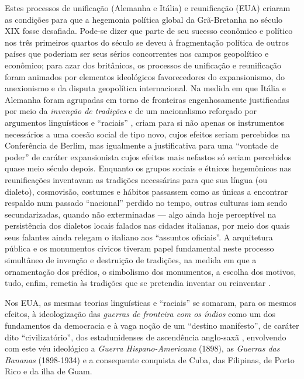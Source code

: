 Estes processos de unificação (Alemanha e Itália) e reunificação (EUA) criaram as condições para que a hegemonia política global da Grã-Bretanha no século XIX fosse desafiada. Pode-se dizer que parte de seu sucesso econômico e político nos três primeiros quartos do século se deveu à fragmentação política de outros países que poderiam ser seus sérios concorrentes nos campos geopolítico e econômico; para azar dos britânicos, os processos de unificação e reunificação foram animados por elementos ideológicos favorecedores do expansionismo, do anexionismo e da disputa geopolítica internacional. Na medida em que Itália e Alemanha foram agrupadas em torno de fronteiras engenhosamente justificadas por meio da \textit{invenção de tradições} \cite{hobsbawm_prodtrad_2012} e de um nacionalismo reforçado por argumentos linguísticos e ``raciais'' \cite{hobsbawm_transfnac_2011}, criam para si não apenas os instrumentos necessários a uma coesão social de tipo novo, cujos efeitos seriam percebidos na Conferência de Berlim, mas igualmente a justificativa para uma ``vontade de poder'' de caráter expansionista \cite{rocker_nacult_1954} cujos efeitos mais nefastos só seriam percebidos quase meio século depois. Enquanto os grupos sociais e étnicos hegemônicos nas reunificações inventavam as tradições necessárias para que sua língua (ou dialeto), cosmovisão, costumes e hábitos passassem como as únicas a encontrar respaldo num passado ``nacional'' perdido no tempo, outras culturas iam sendo secundarizadas, quando não exterminadas --- algo ainda hoje perceptível na persistência dos dialetos locais falados nas cidades italianas, por meio dos quais seus falantes ainda relegam o italiano aos ``assuntos oficiais''. A arquitetura pública e os monumentos cívicos tiveram papel fundamental neste processo simultâneo de invenção e destruição de tradições, na medida em que a ornamentação dos prédios, o simbolismo dos monumentos, a escolha dos motivos, tudo, enfim, remetia às tradições que se pretendia inventar ou reinventar \cite{hobsbawm_prodtrad_2012}.

Nos EUA, as mesmas teorias linguísticas e ``raciais'' se somaram, para os mesmos efeitos, à ideologização das \textit{guerras de fronteira com os índios} como um dos fundamentos da democracia \cite{turner_frontier_1920} e à vaga noção de um ``destino manifesto'', de caráter dito ``civilizatório'', dos estadunidenses de ascendência anglo-saxã \cite{brown_mandest__1980,horsman_mandest_1981}, envolvendo com este véu ideológico a \textit{Guerra Hispano-Americana} (1898), as \textit{Guerras das Bananas} (1898-1934) e a consequente conquista de Cuba, das Filipinas, de Porto Rico e da ilha de Guam.


